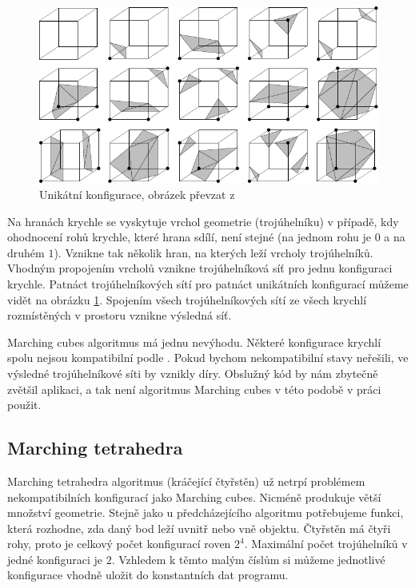 \begin{figure}[h]
\centering
\includegraphics[width=15cm,keepaspectratio]{obr/mccase.pdf}
\caption{Unikátní konfigurace, obrázek převzat z \cite{MARCHINGCUBESCASE}}
\label{fig:mccase}
\end{figure}

Na hranách krychle se vyskytuje vrchol geometrie (trojúhelníku) v případě, kdy ohodnocení rohů krychle, které hrana sdílí, není stejné (na jednom rohu je $0$ a na druhém $1$).
Vznikne tak několik hran, na kterých leží vrcholy trojúhelníků.
Vhodným propojením vrcholů vznikne trojúhelníková síť pro jednu konfiguraci krychle.
Patnáct trojúhelníkových sítí pro patnáct unikátních konfigurací můžeme vidět na obrázku \ref{fig:mccase}.
Spojením všech trojúhelníkových sítí ze všech krychlí rozmístěných v prostoru vznikne výsledná síť.


Marching cubes algoritmus má jednu nevýhodu.
Některé konfigurace krychlí spolu nejsou kompatibilní podle \cite{MARCHINGCUBES}.
Pokud bychom nekompatibilní stavy neřešili, ve výsledné troj\-ú\-hel\-ní\-ko\-vé síti by vznikly díry.
Obslužný kód by nám zbytečně zvětšil aplikaci, a tak není algoritmus Marching cubes v této podobě v práci použit.

\subsection{Marching tetrahedra}
Marching tetrahedra algoritmus (kráčející čtyřstěn) už netrpí problémem nekompatibilních konfigurací jako Marching cubes.
Nicméně produkuje větší množství geometrie.
Stejně jako u předcházejícího algoritmu potřebujeme funkci, která rozhodne, zda daný bod leží uvnitř nebo vně objektu.
Čtyřstěn má čtyři rohy, proto je celkový počet konfigurací roven $2^4$.
Maximální počet trojúhelníků v jedné konfiguraci je $2$.
Vzhledem k těmto malým číslům si můžeme jednotlivé konfigurace vhodně uložit do konstantních dat programu.

